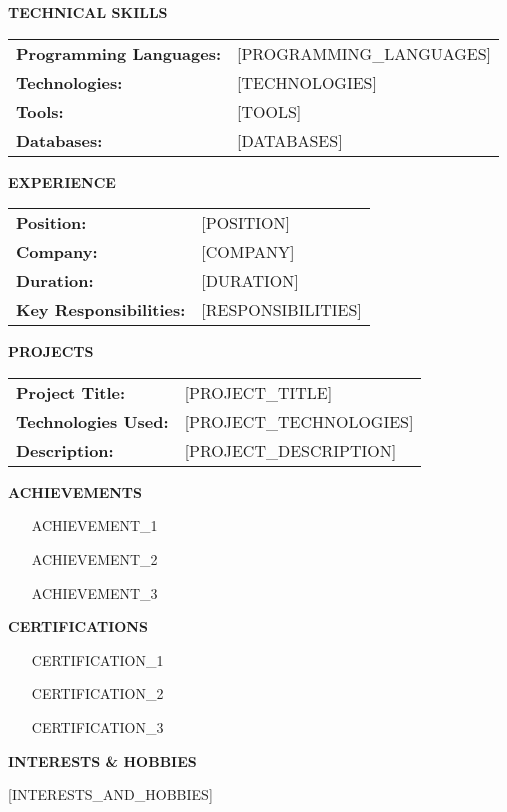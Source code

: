 \documentclass[11pt,a4paper]{article}
\newcommand{\biosection}[1]{
    \vspace{0.4cm}
    \noindent\textbf{#1}
    \vspace{0.2cm}
}
\begin{document}
\biosection{TECHNICAL SKILLS}

\begin{tabular}{ll}
\textbf{Programming Languages:} & [PROGRAMMING_LANGUAGES] \\
\textbf{Technologies:} & [TECHNOLOGIES] \\
\textbf{Tools:} & [TOOLS] \\
\textbf{Databases:} & [DATABASES] \\
\end{tabular}

\biosection{EXPERIENCE}

\begin{tabular}{ll}
\textbf{Position:} & [POSITION] \\
\textbf{Company:} & [COMPANY] \\
\textbf{Duration:} & [DURATION] \\
\textbf{Key Responsibilities:} & [RESPONSIBILITIES] \\
\end{tabular}

\biosection{PROJECTS}

\begin{tabular}{ll}
\textbf{Project Title:} & [PROJECT_TITLE] \\
\textbf{Technologies Used:} & [PROJECT_TECHNOLOGIES] \\
\textbf{Description:} & [PROJECT_DESCRIPTION] \\
\end{tabular}

\biosection{ACHIEVEMENTS}

\begin{itemize}
\item [ACHIEVEMENT_1]
\item [ACHIEVEMENT_2]
\item [ACHIEVEMENT_3]
\end{itemize}

\biosection{CERTIFICATIONS}

\begin{itemize}
\item [CERTIFICATION_1]
\item [CERTIFICATION_2]
\item [CERTIFICATION_3]
\end{itemize}

\biosection{INTERESTS \& HOBBIES}

[INTERESTS_AND_HOBBIES]
\end{document}
